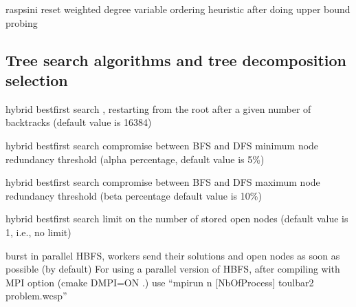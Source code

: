 \documentclass[letterpaper,10pt,openany,oneside,english]{sphinxmanual}
\begin{document}
\begin{optionlist}{3cm}
\item [\sphinxhyphen{}raspsini]  
\sphinxAtStartPar
reset weighted degree variable ordering heuristic after doing
upper bound probing
\end{optionlist}


\subsection{Tree search algorithms and tree decomposition selection}
\label{\detokenize{userdoc:tree-search-algorithms-and-tree-decomposition-selection}}\begin{description}
\sphinxAtStartPar
hybrid best\sphinxhyphen{}first search , restarting from the
root after a given number of backtracks (default value is 16384)

\sphinxAtStartPar
hybrid best\sphinxhyphen{}first search compromise between BFS and DFS minimum node redundancy
threshold (alpha percentage, default value is 5\%)

\sphinxAtStartPar
hybrid best\sphinxhyphen{}first search compromise between BFS and DFS maximum node redundancy
threshold (beta percentage default value is 10\%)

\sphinxAtStartPar
hybrid best\sphinxhyphen{}first search limit on the number
of stored open nodes (default value is \sphinxhyphen{}1, i.e., no limit)

\end{description}
\begin{optionlist}{3cm}
\item [\sphinxhyphen{}burst]  
\sphinxAtStartPar
in parallel HBFS, workers send their solutions and open nodes as soon as possible (by default)
For using a parallel version of HBFS, after compiling with MPI option (cmake \sphinxhyphen{}DMPI=ON .)
use “mpirun \sphinxhyphen{}n {[}NbOfProcess{]} toulbar2 problem.wcsp”
\end{optionlist}
\end{document}
